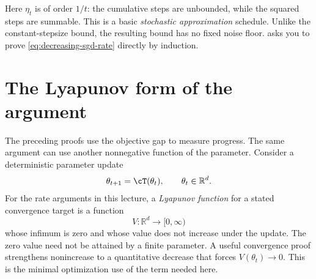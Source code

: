\documentclass[11pt,twoside]{article}
\newcommand{\R}{\mathbb R}
\theoremstyle{definition}
\theoremstyle{remark}
\begin{document}
Here $\eta_t$ is of order $1/t$: the cumulative steps are unbounded, while
the squared steps are summable. This is a basic \emph{stochastic
approximation} schedule. Unlike the constant-stepsize bound, the resulting
bound has no fixed noise floor.  asks you to
prove \cref{eq:decreasing-sgd-rate} directly by induction.

\section{The Lyapunov form of the argument}
\label{sec:lyapunov}

The preceding proofs use the objective gap to measure progress. The same
argument can use another nonnegative function of the parameter. Consider a
deterministic parameter update
\begin{align}
 \theta_{t+1}=\cT(\theta_t),
 \qquad \theta_t\in\R^d.   \label{eq:statupd}
\end{align}
For the rate arguments in this lecture, a \emph{Lyapunov function} for a
stated convergence target is a function
\[
 V:\R^d\longrightarrow[0,\infty)
\]
whose infimum is zero and whose value does not increase under the update. The
zero value need not be attained by a finite parameter. A useful convergence proof
strengthens nonincrease to a quantitative decrease that forces
$V(\theta_t)\to0$. This is the minimal optimization use of the term needed
here.
\end{document}
